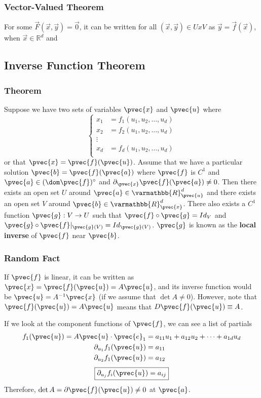 \documentclass[11 pt, twoside]{article}
\begin{document}
\subsubsection{Vector-Valued Theorem}
For some $\vec{F}(\vec{x}, \vec{y}) = \vec{0}$, it can be written for all $(\vec{x}, \vec{y}) \in U x V$ as $\vec{y} = \vec{f}(\vec{x})$, when $\vec{x} \in \mathbb{R}^d$ and 

\subsection{Inverse Function Theorem}
\subsubsection{Theorem}
Suppose we have two sets of variables $\pvec{x}$ and $\pvec{u}$ where
\[
\begin{cases}
x_1 &= f_1 (u_1, u_2, \dots, u_d) \\
x_2 &= f_2 (u_1, u_2, \dots, u_d) \\
\vdots & \\
x_d &= f_d (u_1, u_2, \dots, u_d)\\
\end{cases}
\]
or that $\pvec{x} = \pvec{f}(\pvec{u})$. Assume that we have a particular solution
$\pvec{b} = \pvec{f}(\pvec{a})$ where $\pvec{f}$ is $C^1$ and $\pvec{a} \in (\dom
\pvec{f})^\circ$ and $\partial_{\pvec{x}} \pvec{f}(\pvec{a}) \neq 0$. Then there exists an open set $U$ around $\pvec{a} \in
\varmathbb{R}^d_{\pvec{u}}$ and there exists an open set $V$ around $\pvec{b} \in
\varmathbb{R}^d_{\pvec{x}}$. There also exists a $C^1$ function $\pvec{g}: V \to
U$ such that $\pvec{f} \circ \pvec{g} = Id_V$ and $\pvec{g} \circ
\pvec{f}|_{\pvec{g}(V)} = Id_{\pvec{g}(V)}$. $\pvec{g}$ is known as the \textbf{local inverse}
of $\pvec{f}$ near $\pvec{b}$.

\subsubsection{Random Fact}

If $\pvec{f}$ is linear, it can be written as $\pvec{x} = \pvec{f}(\pvec{u}) =
A\pvec{u}$, and its inverse function would be $\pvec{u} = A^{-1}\pvec{x}$ (if we
assume that $\det A \neq 0$). However, note that $\pvec{f}(\pvec{u}) = A\pvec{u}$
means that $D\pvec{f}(\pvec{u}) \equiv A$.

If we look at the component functions of $\pvec{f}$, we can see a list of
partials
\begin{align*}
f_1(\pvec{u}) = A\pvec{u} \cdot \pvec{e}_1 &= a_{11}u_1 + a_{12}u_2 + \dots + a_{1d}u_d\\
\partial_{u_1}f_1(\pvec{u}) &= a_{11}\\
\partial_{u_2}f_1(\pvec{u}) &= a_{12}\\
\end{align*}
\[
\boxed{\partial_{u_j} f_i (\pvec{u}) = a_{ij}}
\]
Therefore, $\det A = \partial \pvec{f}(\pvec{u}) \neq 0$ at $\pvec{a}$.
\end{document}
